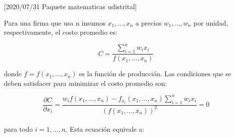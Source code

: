 [2020/07/31 Paquete matematicas udistrital]
\RequirePackage{xcolor, amssymb, amsmath, amsthm, fancyhdr, hyperref, graphicx, tikz, pgfplots, pgf, tkz-euclide, enumerate, float}

\pgfplotsset{width=7cm,compat=1.8}


\theoremstyle{plain}
\newtheorem{teorema}{Teorema}
\newtheorem*{teorema*}{Teorema}
\newtheorem{lema}{Lema}
\newtheorem{proposicion}{Proposición}
\newtheorem{corolario}{Corolario}
\theoremstyle{definition}
\newtheorem{definicion}{Definición}
\theoremstyle{remark}
\newtheorem{nota}{Nota}
\newtheorem{ejercicio}{Ejercicio}

\usepackage[spanish]{babel}

\usepackage{geometry}
\geometry{letterpaper,tmargin=4cm,bmargin=4cm,lmargin=2cm,
	rmargin=2cm, headheight=1cm,headsep=1cm,footskip=2cm}

\usepackage{kpfonts,baskervald}




\usepackage{etoolbox}
\usepackage{hyperref}
\patchcmd{\abstract}{\null\vfil}{}{}{}




Para una firma que usa n insumos $x_{1}, ..., x_{n}$ a precios $w_{1}, ..., w_{n}$ por unidad, respectivamente, el costo promedio es:

\[ C = \frac{\sum_{i=1}^{n} w_{i}x_{i} }{f(x_{1}, ..., x_{n})}\]

donde $f = f(x_{1}, ..., x_{n})$  es la función de producción. Las condiciones que se deben satisfacer para minimizar el costo promedio son:

\[ \frac{\partial C}{\partial x_{i}} = \frac{w_{i}f(x_{1}, ..., x_{n}) - f_{x_{i}}(x_{1}, ..., x_{n}) \sum_{i=1}^{n} w_{i}x_{i}}{(f(x_{1}, ..., x_{n}))^{2}} = 0 \]
\\
para todo $i= 1, ..., n$.  Esta ecuación equivale a:

